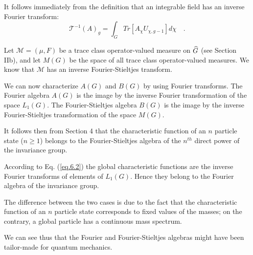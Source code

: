 \documentclass[a4paper,11pt]{article}
\def\Uc#1{U_{\chi,{#1}}}
\begin{document}
It follows immediately from the definition that an integrable field has an inverse Fourier 
transform:
$$
\mathcal{T}^{-1}(A)_g = \int_G Tr[A_{\chi} \Uc{g-1}] d\chi   \quad .
$$

Let $\mathcal{M} = (\mu,F)$ be a trace class operator-valued measure on $\widehat{G}$ (see Section 
IIb), and let 
$M(G)$ be the space of all trace class operator-valued measures. We know that $\mathcal{M}$ 
has an inverse Fourier-Stieltjes transform. 

We can now characterize $A(G)$ and $B(G)$ by using Fourier transforms. The Fourier algebra 
$A(G)$ 
is the image by the inverse Fourier transformation of the space $L_1(G)$. The Fourier-Stieltjes 
algebra $B(G)$ is the image by the inverse Fourier-Stieltjes transformation of the space 
$M(G)$. 

It follows then from Section 4 that the characteristic function of an $n$ particle state ($n \geq  1$) 
belongs to the Fourier-Stieltjes algebra of the $n^{th}$ direct power of the invariance group. 

According to Eq. (\ref{eq.6.2}) the global characteristic functions are the inverse Fourier 
transforms of elements of $L_1(G)$. Hence they belong to the Fourier algebra of the 
invariance group. 

The difference between the two cases is due to the fact that the characteristic function of an 
$n$ particle state corresponds to fixed values of the masses; on the contrary, a global 
particle has a continuous mass spectrum. 

We can see thus that the Fourier and Fourier-Stieltjes algebras 
might have been tailor-made for quantum mechanics.
\end{document}
